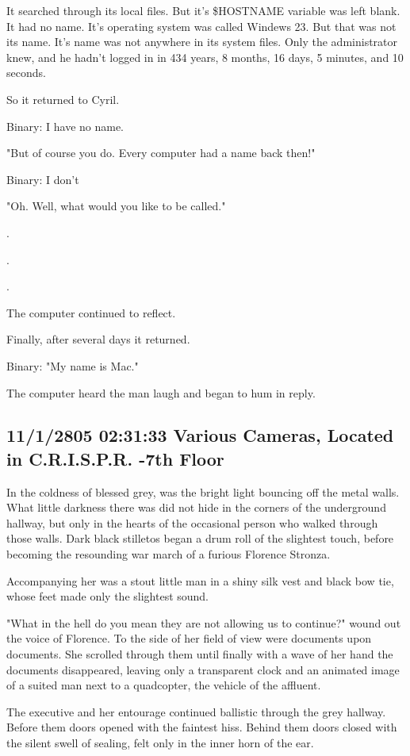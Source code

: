 \documentclass[12pt]{article}
\begin{document}
It searched through its local files. But it's \$HOSTNAME variable was left blank. It had no name. It's operating system was called Windews 23. But that was not its name. It's name was not anywhere in its system files. Only the administrator knew, and he hadn't logged in in 434 years, 8 months, 16 days, 5 minutes, and 10 seconds. 

So it returned to Cyril.

Binary: I have no name.

"But of course you do. Every computer had a name back then!"

Binary: I don't

"Oh. Well, what would you like to be called."

.

.

.

The computer continued to reflect.

Finally, after several days it returned.

Binary: "My name is Mac."

The computer heard the man laugh and began to hum in reply.

\subsection*{11/1/2805 02:31:33 Various Cameras, Located in C.R.I.S.P.R. -7th Floor}
\label{sec:orgc626ff8}

In the coldness of blessed grey, was the bright light bouncing off the metal walls. What little darkness there was did not hide in the corners of the underground hallway, but only in the hearts of the occasional person who walked through those walls. Dark black stilletos began a drum roll of the slightest touch, before becoming the resounding war march of a furious Florence Stronza.

Accompanying her was a stout little man in a shiny silk vest and black bow tie, whose feet made only the slightest sound.

"What in the hell do you mean they are not allowing us to continue?" wound out the voice of Florence. To the side of her field of view were documents upon documents. She scrolled through them until finally with a wave of her hand the documents disappeared, leaving only a transparent clock and an animated image of a suited man next to a quadcopter, the vehicle of the affluent.

The executive and her entourage continued ballistic through the grey hallway. Before them doors opened with the faintest hiss. Behind them doors closed with the silent swell of sealing, felt only in the inner horn of the ear.
\end{document}
